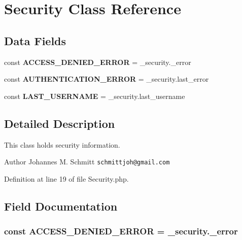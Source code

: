\section{Security Class Reference}
\label{class_symfony_1_1_component_1_1_security_1_1_core_1_1_security}
\subsection*{Data Fields}
\begin{DoxyCompactItemize}
\item 
const {\bf A\+C\+C\+E\+S\+S\+\_\+\+D\+E\+N\+I\+E\+D\+\_\+\+E\+R\+R\+O\+R} = \textquotesingle{}\+\_\+security.\+\_\+error\textquotesingle{}
\item 
const {\bf A\+U\+T\+H\+E\+N\+T\+I\+C\+A\+T\+I\+O\+N\+\_\+\+E\+R\+R\+O\+R} = \textquotesingle{}\+\_\+security.\+last\+\_\+error\textquotesingle{}
\item 
const {\bf L\+A\+S\+T\+\_\+\+U\+S\+E\+R\+N\+A\+M\+E} = \textquotesingle{}\+\_\+security.\+last\+\_\+username\textquotesingle{}
\end{DoxyCompactItemize}


\subsection{Detailed Description}
This class holds security information.

\begin{DoxyAuthor}{Author}
Johannes M. Schmitt {\tt schmittjoh@gmail.\+com} 
\end{DoxyAuthor}


Definition at line 19 of file Security.\+php.



\subsection{Field Documentation}
\subsubsection[{A\+C\+C\+E\+S\+S\+\_\+\+D\+E\+N\+I\+E\+D\+\_\+\+E\+R\+R\+O\+R}]{\setlength{\rightskip}{0pt plus 5cm}const A\+C\+C\+E\+S\+S\+\_\+\+D\+E\+N\+I\+E\+D\+\_\+\+E\+R\+R\+O\+R = \textquotesingle{}\+\_\+security.\+\_\+error\textquotesingle{}}\label{class_symfony_1_1_component_1_1_security_1_1_core_1_1_security_a8cccd6c325c69ed8d216711b5bc23f7f}


